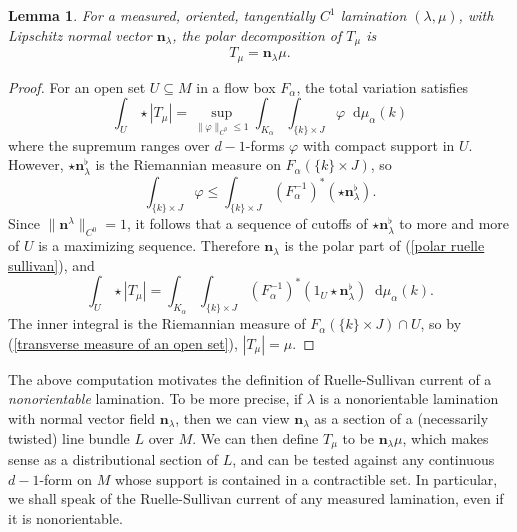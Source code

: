 \documentclass[reqno,11pt]{amsart}
\newcommand*\dif{\mathop{}\!\mathrm{d}}
\newcommand{\normal}{\mathbf n}
\newtheorem{lemma}[theorem]{Lemma}
\theoremstyle{definition}
\numberwithin{equation}{section}
\begin{document}
\begin{lemma}
For a measured, oriented, tangentially $C^1$ lamination $(\lambda, \mu)$, with Lipschitz normal vector $\normal_\lambda$, the polar decomposition of $T_\mu$ is
\begin{equation}\label{polar ruelle sullivan}
T_\mu = \normal_\lambda \mu.
\end{equation}
\end{lemma}
\begin{proof}
For an open set $U \subseteq M$ in a flow box $F_\alpha$, the total variation satisfies
$$\int_U \star |T_\mu| = \sup_{\|\varphi\|_{C^0} \leq 1} \int_{K_\alpha} \int_{\{k\} \times J} \varphi \dif \mu_\alpha(k)$$
where the supremum ranges over $d-1$-forms $\varphi$ with compact support in $U$.
However, $\star \normal_\lambda^\flat$ is the Riemannian measure on $F_\alpha(\{k\} \times J)$, so
$$\int_{\{k\} \times J} \varphi \leq \int_{\{k\} \times J} (F_\alpha^{-1})^*(\star \normal_\lambda^\flat).$$
Since $\|\normal^\lambda\|_{C^0} = 1$, it follows that a sequence of cutoffs of $\star \normal_\lambda^\flat$ to more and more of $U$ is a maximizing sequence.
Therefore $\normal_\lambda$ is the polar part of (\ref{polar ruelle sullivan}), and
$$\int_U \star |T_\mu| = \int_{K_\alpha} \int_{\{k\} \times J} (F_\alpha^{-1})^*(1_U \star \normal_\lambda^\flat) \dif \mu_\alpha(k).$$
The inner integral is the Riemannian measure of $F_\alpha(\{k\} \times J) \cap U$, so by (\ref{transverse measure of an open set}), $|T_\mu| = \mu$.
\end{proof}

The above computation motivates the definition of Ruelle-Sullivan current of a \emph{nonorientable} lamination.
To be more precise, if $\lambda$ is a nonorientable lamination with normal vector field $\normal_\lambda$, then we can view $\normal_\lambda$ as a section of a (necessarily twisted) line bundle $L$ over $M$.
We can then define $T_\mu$ to be $\normal_\lambda \mu$, which makes sense as a distributional section of $L$, and can be tested against any continuous $d-1$-form on $M$ whose support is contained in a contractible set.
In particular, we shall speak of the Ruelle-Sullivan current of any measured lamination, even if it is nonorientable.
\end{document}
